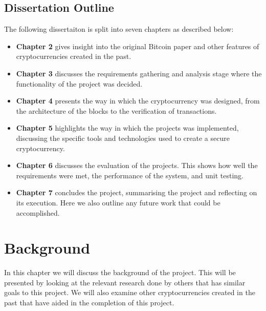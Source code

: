 \documentclass{l4proj}
\begin{document}
\section{Dissertation Outline}
The following dissertaiton is split into seven chapters as described below:
\begin{itemize}
    \item
        \textbf{Chapter 2} gives insight into the original Bitcoin paper and other features of cryptocurrencies
        created in the past.
    \item
        \textbf{Chapter 3} discusses the requirements gathering and analysis stage where the functionality
        of the project was decided.
    \item
        \textbf{Chapter 4} presents the way in which the cryptocurrency was designed, from the architecture of the blocks
        to the verification of transactions.
    \item
        \textbf{Chapter 5} highlights the way in which the projects was implemented, discussing the specific tools and 
        technologies used to create a secure cryptocurrency.
    \item
        \textbf{Chapter 6} discusses the evaluation of the projects. This shows how well the requirements were met, the
        performance of the system, and unit testing.
    \item
        \textbf{Chapter 7} concludes the project, summarising the project and reflecting on its execution. Here we also
        outline any future work that could be accomplished.
\end{itemize}


\chapter{Background}
In this chapter we will discuss the background of the project. This will be presented by looking at the relevant research done by 
others that has similar goals to this project. We will also examine other cryptocurrencies created in the past that have aided 
in the completion of this project.
\end{document}
